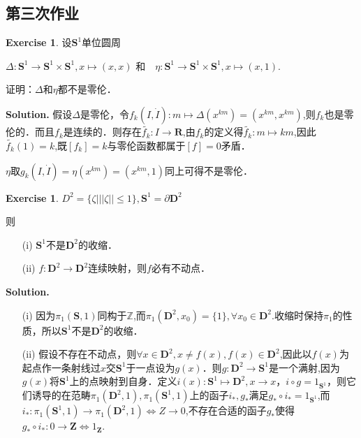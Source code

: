 \documentclass[a4paper]{book}
\newenvironment{solution}%
{\noindent\textbf{Solution.}}%
{\qedhere}
\numberwithin{equation}{chapter}
\theoremstyle{definition}
\newtheorem{exc}[exm]{Exercise}
\begin{document}
\begin{multicols}{2}
\setlength{\columnseprule}{0.2pt}  

\section{第三次作业}

\begin{exc}
	设$ \mathbf{S}^1 $单位圆周
	
	$\Delta: \mathbf{S}^1 \rightarrow  \mathbf{S}^1 \times  \mathbf{S}^1, x \mapsto (x,x) \text{ 和　} \eta:  \mathbf{S}^1 \rightarrow  \mathbf{S}^1 \times  \mathbf{S}^1, x \mapsto (x,1) $.
	
	证明：$ \Delta $和$ \eta $都不是零伦．
\end{exc}

\begin{solution}
	假设$ \Delta $是零伦，令$ f_k(I,\dot{I}): m \mapsto \Delta(x^{km}) = (x^{km}, x^{km}) $,则$ f_k $也是零伦的．而且$ f_k $是连续的．则存在$ \widetilde{f_k}: I \rightarrow \mathbf{R} $,由$ f_k $的定义得$ \widetilde{f_k}: m \mapsto km$,因此$ \widetilde{f_k}(1) = k $,既$ [f_k] = k $与零伦函数都属于$ [f] =0 $矛盾．
	
	$ \eta $取$ g_k(I,\dot{I}) = \eta(x^{km}) = (x^{km},　1) $同上可得不是零伦．
\end{solution}

\begin{exc}
	$ D^2 = \{ \zeta \big| ||\zeta|| \leq 1 \}, \mathbf{S}^1 = \partial \mathbf{D}^2 $
	
	则\begin{itemize}
		\item [(i)] $ \mathbf{S}^1 $不是$ \mathbf{D}^2 $的收缩．
		\item [(ii)] $ f: \mathbf{D}^2 \rightarrow \mathbf{D}^2 $连续映射，则$ f $必有不动点．
	\end{itemize}
\end{exc}

\begin{solution}
	\begin{itemize}
		\item [(i)] 因为$ \pi_1 (\mathbf{S}, 1) $同构于$ \mathbb{Z} $,而$ \pi_1 ( \mathbf{D}^2 , x_0) = \{1\}, \forall x_0 \in  \mathbf{D}^2 $.收缩时保持$ \pi_1 $的性质，所以$ \mathbf{S}^1 $不是$ \mathbf{D}^2 $的收缩．
		
		\item [(ii)] 假设不存在不动点，则$ \forall x \in \mathbf{D}^2, x \neq f(x), f(x) \in  \mathbf{D}^2$,因此以$ f(x) $为起点作一条射线过$ x $交$ \mathbf{S}^1 $于一点设为$ g(x) $．则$ g: \mathbf{D}^2 \rightarrow \mathbf{S}^1 $是一个满射,因为$ g(x) $将$ \mathbf{S}^1 $上的点映射到自身．定义$ i(x): \mathbf{S}^1 \mapsto \mathbf{D}^2, x \rightarrow x $，$ i \circ g = 1_{\mathbf{S}^1} $，则它们诱导的在范畴$ \pi_1(\mathbf{D}^2, 1), \pi_1(\mathbf{S}^1, 1) $上的函子$ i_*, g_* $满足$ g_* \circ i_* = 1_{\mathbf{S}^1} $,而$ i_*:  \pi_1(\mathbf{S}^1, 1) \rightarrow \pi_1(\mathbf{D}^2, 1) \Longleftrightarrow Z \rightarrow {0} $,不存在合适的函子$ g_* $使得$ g_* \circ i_*: {0} \rightarrow \mathbf{Z} \Longleftrightarrow 1_{\mathbf{Z}} $.
	\end{itemize}
\end{solution}


\end{multicols}
\end{document}
